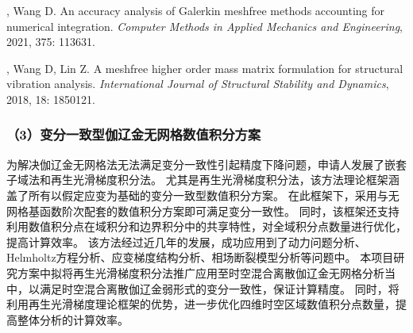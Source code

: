 \vspace{-50pt}
\begin{thebibliography}{1}
	\providecommand{\bibauthor}[1]{#1}
	\providecommand{\bibeditor}[1]{#1}
	\providecommand{\bibtranslator}[1]{#1}
	\providecommand{\bibtitle}[1]{#1}
	\providecommand{\bibbooktitle}[1]{#1}
	\providecommand{\bibjournal}[1]{#1}
	\providecommand{\bibmark}[1]{#1}
	\providecommand{\bibcountry}[1]{#1}
	\providecommand{\bibpatentid}[1]{#1}
	\providecommand{\bibedition}[1]{#1}
	\providecommand{\biborganization}[1]{#1}
	\providecommand{\bibaddress}[1]{#1}
	\providecommand{\bibpublisher}[1]{#1}
	\providecommand{\bibinstitution}[1]{#1}
	\providecommand{\bibschool}[1]{#1}
	\providecommand{\bibvolume}[1]{#1}
	\providecommand{\bibnumber}[1]{#1}
	\providecommand{\bibversion}[1]{#1}
	\providecommand{\bibpages}[1]{#1}
	\providecommand{\bibmodifydate}[1]{#1}
	\providecommand{\bibcitedate}[1]{#1}
	\providecommand{\bibyear}[1]{#1}
	\providecommand{\bibdate}[1]{#1}
	\providecommand{\biburl}[1]{\newline\url{#1}}

	, Wang D.
	\newblock An accuracy analysis of {{Galerkin}} meshfree methods accounting for
	  numerical integration.
	\newblock \emph{Computer Methods in Applied Mechanics and Engineering}, 2021,
	  375: 113631.

	, Wang D, Lin Z.
	\newblock A meshfree higher order mass matrix formulation for structural
	  vibration analysis.
	\newblock \emph{International Journal of Structural Stability and Dynamics},
	  2018, 18: 1850121.

\end{thebibliography}

\subsubsection*{\bfseries （3）变分一致型伽辽金无网格数值积分方案}
为解决伽辽金无网格法无法满足变分一致性引起精度下降问题，申请人发展了嵌套子域法和再生光滑梯度积分法。
尤其是再生光滑梯度积分法，该方法理论框架涵盖了所有以假定应变为基础的变分一致型数值积分方案。
在此框架下，采用与无网格基函数阶次配套的数值积分方案即可满足变分一致性。
同时，该框架还支持利用数值积分点在域积分和边界积分中的共享特性，对全域积分点数量进行优化，提高计算效率。
该方法经过近几年的发展，成功应用到了动力问题分析、Helmholtz方程分析、应变梯度结构分析、相场断裂模型分析等问题中。
本项目研究方案中拟将再生光滑梯度积分法推广应用至时空混合离散伽辽金无网格分析当中，以满足时空混合离散伽辽金弱形式的变分一致性，保证计算精度。
同时，将利用再生光滑梯度理论框架的优势，进一步优化四维时空区域数值积分点数量，提高整体分析的计算效率。

